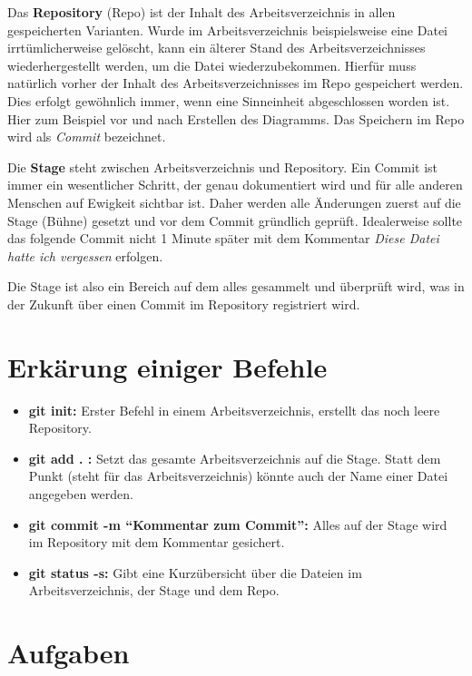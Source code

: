 \documentclass[11pt]{article}
\begin{document}
Das \textbf{Repository} (Repo) ist der Inhalt des Arbeitsverzeichnis in allen
gespeicherten Varianten. Wurde im Arbeitsverzeichnis beispielsweise
eine Datei irrtümlicherweise gelöscht, kann ein älterer Stand des
Arbeitsverzeichnisses wiederhergestellt werden, um die Datei
wiederzubekommen. Hierfür muss natürlich vorher der Inhalt des
Arbeitsverzeichnisses im Repo gespeichert werden. Dies erfolgt
gewöhnlich immer, wenn eine Sinneinheit abgeschlossen worden ist. Hier
zum Beispiel vor und nach Erstellen des Diagramms. Das Speichern im
Repo wird als \textsl{Commit} bezeichnet.

Die \textbf{Stage} steht zwischen Arbeitsverzeichnis und Repository.
Ein Commit ist immer ein wesentlicher Schritt, der genau dokumentiert
wird und für alle anderen Menschen auf Ewigkeit sichtbar ist. Daher
werden alle Änderungen zuerst auf die Stage (Bühne) gesetzt und vor
dem Commit gründlich geprüft. Idealerweise sollte das folgende Commit
nicht 1 Minute später mit dem Kommentar \textsl{Diese Datei hatte ich
  vergessen} erfolgen.

Die Stage ist also ein Bereich auf dem alles gesammelt und überprüft
wird, was in der Zukunft über einen Commit im  Repository registriert wird.



\section{Erkärung einiger Befehle}
\begin{itemize}
\item \textbf{git init:} Erster Befehl in einem Arbeitsverzeichnis,
  erstellt das noch leere Repository.
\item \textbf{git add . :} Setzt das gesamte Arbeitsverzeichnis auf
  die Stage. Statt dem Punkt (steht für das Arbeitsverzeichnis) könnte
  auch der Name einer Datei angegeben werden.
\item \textbf{git commit -m \enquote{Kommentar zum Commit}:} Alles auf
  der Stage wird im Repository mit dem Kommentar gesichert.
\item \textbf{git status -s:} Gibt eine Kurzübersicht über die Dateien im Arbeitsverzeichnis, der Stage und dem Repo. 

\end{itemize}

\section{Aufgaben}
\end{document}
